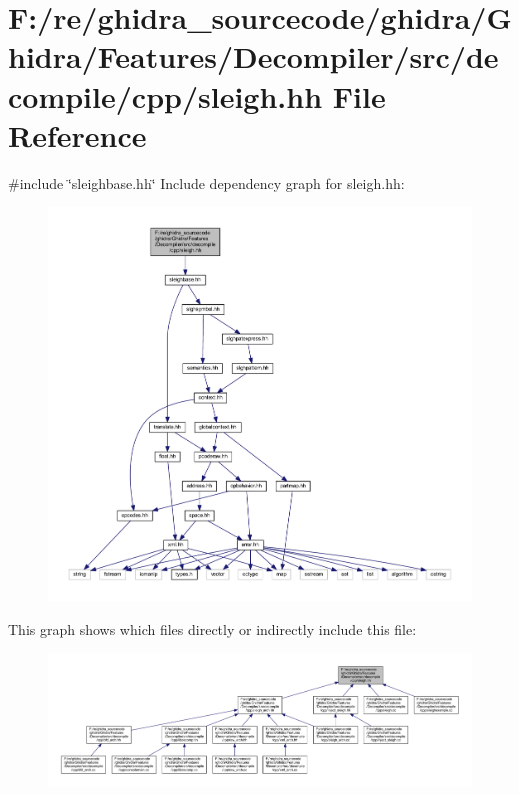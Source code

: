 \hypertarget{sleigh_8hh}{}\section{F\+:/re/ghidra\+\_\+sourcecode/ghidra/\+Ghidra/\+Features/\+Decompiler/src/decompile/cpp/sleigh.hh File Reference}
\label{sleigh_8hh}
{\ttfamily \#include \char`\"{}sleighbase.\+hh\char`\"{}}\newline
Include dependency graph for sleigh.\+hh\+:
\nopagebreak
\begin{figure}[H]
\begin{center}
\leavevmode
\includegraphics[width=350pt]{sleigh_8hh__incl}
\end{center}
\end{figure}
This graph shows which files directly or indirectly include this file\+:
\nopagebreak
\begin{figure}[H]
\begin{center}
\leavevmode
\includegraphics[width=350pt]{sleigh_8hh__dep__incl}
\end{center}
\end{figure}
